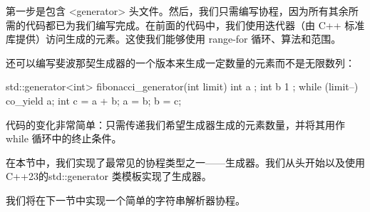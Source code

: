 第一步是包含 <generator> 头文件。然后，我们只需编写协程，因为所有其余所需的代码都已为我们编写完成。在前面的代码中，我们使用迭代器（由 C++ 标准库提供）访问生成的元素。这使我们能够使用 range-for 循环、算法和范围。

还可以编写斐波那契生成器的一个版本来生成一定数量的元素而不是无限数列：

\begin{cpp}
std::generator<int> fibonacci_generator(int limit) {
    int a{ };
    int b{ 1 };
    while (limit--) {
        co_yield a;
        int c = a + b;
        a = b;
        b = c;
    }
}
\end{cpp}

代码的变化非常简单：只需传递我们希望生成器生成的元素数量，并将其用作 while 循环中的终止条件。

在本节中，我们实现了最常见的协程类型之一——生成器。我们从头开始以及使用 C++23的std::generator 类模板实现了生成器。

我们将在下一节中实现一个简单的字符串解析器协程。










